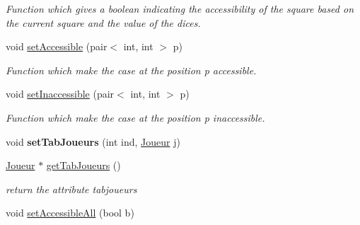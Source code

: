 \begin{DoxyCompactItemize}
\begin{DoxyCompactList}\small\item\em Function which gives a boolean indicating the accessibility of the square based on the current square and the value of the dices. \item\end{DoxyCompactList}\item 
\hypertarget{class_moteur_jeu_a827eeb8dcaf11c30f10bb31501b8ddb9}{
void \hyperlink{class_moteur_jeu_a827eeb8dcaf11c30f10bb31501b8ddb9}{setAccessible} (pair$<$ int, int $>$ p)}
\label{class_moteur_jeu_a827eeb8dcaf11c30f10bb31501b8ddb9}

\begin{DoxyCompactList}\small\item\em Function which make the case at the position p accessible. \item\end{DoxyCompactList}\item 
\hypertarget{class_moteur_jeu_a2f9cf18b743b36a404ae0cd2db1a8f16}{
void \hyperlink{class_moteur_jeu_a2f9cf18b743b36a404ae0cd2db1a8f16}{setInaccessible} (pair$<$ int, int $>$ p)}
\label{class_moteur_jeu_a2f9cf18b743b36a404ae0cd2db1a8f16}

\begin{DoxyCompactList}\small\item\em Function which make the case at the position p inaccessible. \item\end{DoxyCompactList}\item 
\hypertarget{class_moteur_jeu_a920bcbd2494e6f342d060275e28f73a7}{
void {\bfseries setTabJoueurs} (int ind, \hyperlink{class_joueur}{Joueur} j)}
\label{class_moteur_jeu_a920bcbd2494e6f342d060275e28f73a7}

\item 
\hyperlink{class_joueur}{Joueur} $\ast$ \hyperlink{class_moteur_jeu_a7a80dd99e515af8e09d3cc3749d38439}{getTabJoueurs} ()
\begin{DoxyCompactList}\small\item\em return the attribute tabjoueurs \item\end{DoxyCompactList}\item 
\hypertarget{class_moteur_jeu_ad98a200b000d8e12a04103f4ec26f3e8}{
void \hyperlink{class_moteur_jeu_ad98a200b000d8e12a04103f4ec26f3e8}{setAccessibleAll} (bool b)}
\label{class_moteur_jeu_ad98a200b000d8e12a04103f4ec26f3e8}


\end{DoxyCompactItemize}

